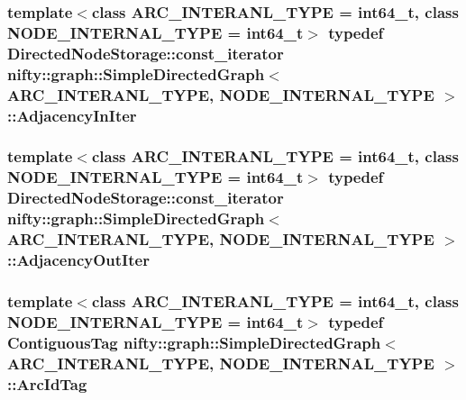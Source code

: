 \subsubsection[{Adjacency\+In\+Iter}]{\setlength{\rightskip}{0pt plus 5cm}template$<$class A\+R\+C\+\_\+\+I\+N\+T\+E\+R\+A\+N\+L\+\_\+\+T\+Y\+P\+E  = int64\+\_\+t, class N\+O\+D\+E\+\_\+\+I\+N\+T\+E\+R\+N\+A\+L\+\_\+\+T\+Y\+P\+E  = int64\+\_\+t$>$ typedef Directed\+Node\+Storage\+::const\+\_\+iterator {\bf nifty\+::graph\+::\+Simple\+Directed\+Graph}$<$ A\+R\+C\+\_\+\+I\+N\+T\+E\+R\+A\+N\+L\+\_\+\+T\+Y\+P\+E, N\+O\+D\+E\+\_\+\+I\+N\+T\+E\+R\+N\+A\+L\+\_\+\+T\+Y\+P\+E $>$\+::{\bf Adjacency\+In\+Iter}}\label{classnifty_1_1graph_1_1SimpleDirectedGraph_aaf7f58391a2b6e0db7983462dbd6a542}
\hypertarget{classnifty_1_1graph_1_1SimpleDirectedGraph_a5af7a4eb6bbc44b805a44bb131786dd0}{}
\subsubsection[{Adjacency\+Out\+Iter}]{\setlength{\rightskip}{0pt plus 5cm}template$<$class A\+R\+C\+\_\+\+I\+N\+T\+E\+R\+A\+N\+L\+\_\+\+T\+Y\+P\+E  = int64\+\_\+t, class N\+O\+D\+E\+\_\+\+I\+N\+T\+E\+R\+N\+A\+L\+\_\+\+T\+Y\+P\+E  = int64\+\_\+t$>$ typedef Directed\+Node\+Storage\+::const\+\_\+iterator {\bf nifty\+::graph\+::\+Simple\+Directed\+Graph}$<$ A\+R\+C\+\_\+\+I\+N\+T\+E\+R\+A\+N\+L\+\_\+\+T\+Y\+P\+E, N\+O\+D\+E\+\_\+\+I\+N\+T\+E\+R\+N\+A\+L\+\_\+\+T\+Y\+P\+E $>$\+::{\bf Adjacency\+Out\+Iter}}\label{classnifty_1_1graph_1_1SimpleDirectedGraph_a5af7a4eb6bbc44b805a44bb131786dd0}
\hypertarget{classnifty_1_1graph_1_1SimpleDirectedGraph_a0e61985b1487d018ab09fcefb2302c99}{}
\subsubsection[{Arc\+Id\+Tag}]{\setlength{\rightskip}{0pt plus 5cm}template$<$class A\+R\+C\+\_\+\+I\+N\+T\+E\+R\+A\+N\+L\+\_\+\+T\+Y\+P\+E  = int64\+\_\+t, class N\+O\+D\+E\+\_\+\+I\+N\+T\+E\+R\+N\+A\+L\+\_\+\+T\+Y\+P\+E  = int64\+\_\+t$>$ typedef {\bf Contiguous\+Tag} {\bf nifty\+::graph\+::\+Simple\+Directed\+Graph}$<$ A\+R\+C\+\_\+\+I\+N\+T\+E\+R\+A\+N\+L\+\_\+\+T\+Y\+P\+E, N\+O\+D\+E\+\_\+\+I\+N\+T\+E\+R\+N\+A\+L\+\_\+\+T\+Y\+P\+E $>$\+::{\bf Arc\+Id\+Tag}}\label{classnifty_1_1graph_1_1SimpleDirectedGraph_a0e61985b1487d018ab09fcefb2302c99}
\hypertarget{classnifty_1_1graph_1_1SimpleDirectedGraph_ad555ff3a9746915c60858cd7d55ae342}{}
